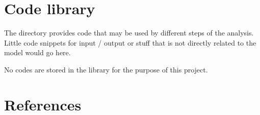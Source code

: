 \documentclass[a4paper,11pt,english]{sphinxmanual}
\begin{document}
\chapter{Code library}
\label{\detokenize{library:code-library}}\label{\detokenize{library:library}}\label{\detokenize{library::doc}}
The directory  provides code that may be used by different steps of the analysis. Little code snippets for input / output or stuff that is not directly related to the model would go here.

No codes are stored in the library for the purpose of this project.


\chapter{References}
\label{\detokenize{references:references}}\label{\detokenize{references:id1}}\label{\detokenize{references::doc}}
\end{document}
